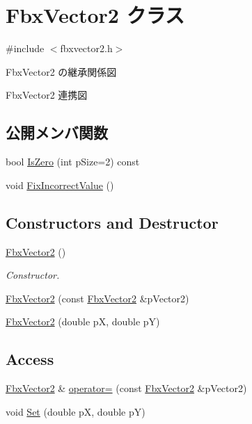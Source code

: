 \hypertarget{class_fbx_vector2}{}\section{Fbx\+Vector2 クラス}
\label{class_fbx_vector2}


{\ttfamily \#include $<$fbxvector2.\+h$>$}



Fbx\+Vector2 の継承関係図


Fbx\+Vector2 連携図
\subsection*{公開メンバ関数}
\begin{DoxyCompactItemize}
\item 
bool \hyperlink{class_fbx_vector2_ae98104ed051bcace69d39d459c39bae4}{Is\+Zero} (int p\+Size=2) const
\item 
void \hyperlink{class_fbx_vector2_a1045bf41d94e9bce617163959fae50ba}{Fix\+Incorrect\+Value} ()
\end{DoxyCompactItemize}
\subsection*{Constructors and Destructor}
\begin{DoxyCompactItemize}
\item 
\hyperlink{class_fbx_vector2_afb0716473e400a06bd41f337d5d9d8d2}{Fbx\+Vector2} ()
\begin{DoxyCompactList}\small\item\em Constructor. \end{DoxyCompactList}\item 
\hyperlink{class_fbx_vector2_ae3e34456e4fbf24627590da182d3489f}{Fbx\+Vector2} (const \hyperlink{class_fbx_vector2}{Fbx\+Vector2} \&p\+Vector2)
\item 
\hyperlink{class_fbx_vector2_ae2d1e80f75a1566de936cfa8532a49b3}{Fbx\+Vector2} (double pX, double pY)
\end{DoxyCompactItemize}
\subsection*{Access}
\begin{DoxyCompactItemize}
\item 
\hyperlink{class_fbx_vector2}{Fbx\+Vector2} \& \hyperlink{class_fbx_vector2_a1133cfe1028a4e62ce6dceb579fd8450}{operator=} (const \hyperlink{class_fbx_vector2}{Fbx\+Vector2} \&p\+Vector2)
\item 
void \hyperlink{class_fbx_vector2_a3a28093a354342dcf424cab26f732a57}{Set} (double pX, double pY)
\end{DoxyCompactItemize}
